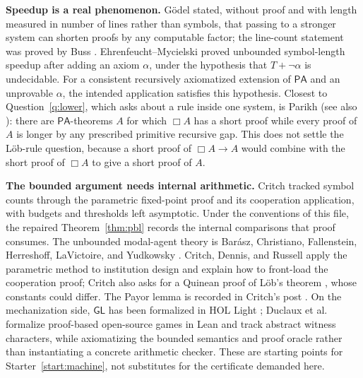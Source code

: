 \documentclass[11pt]{amsart}
\theoremstyle{plain}
\theoremstyle{definition}
\newcommand{\PA}{\mathsf{PA}}
\newcommand{\GL}{\mathsf{GL}}
\begin{document}
\textbf{Speedup is a real phenomenon.} G\"odel \cite{godel1936} stated, without proof and with length measured in number of lines rather than symbols, that passing to a stronger system can shorten proofs by any computable factor; the line-count statement was proved by Buss \cite{buss1994}. Ehrenfeucht--Mycielski \cite{ehrenfeucht1971} proved unbounded symbol-length speedup after adding an axiom $\alpha$, under the hypothesis that $T+\neg\alpha$ is undecidable. For a consistent recursively axiomatized extension of $\PA$ and an unprovable $\alpha$, the intended application satisfies this hypothesis. Closest to Question~\ref{q:lower}, which asks about a rule inside one system, is Parikh \cite{parikh1971} (see also \cite{buss1999}): there are $\PA$-theorems $A$ for which $\Box A$ has a short proof while every proof of $A$ is longer by any prescribed primitive recursive gap. This does not settle the L\"ob-rule question, because a short proof of $\Box A\to A$ would combine with the short proof of $\Box A$ to give a short proof of $A$.

\textbf{The bounded argument needs internal arithmetic.} Critch \cite{critch2016} tracked symbol counts through the parametric fixed-point proof and its cooperation application, with budgets and thresholds left asymptotic. Under the conventions of this file, the repaired Theorem~\ref{thm:pbl} records the internal comparisons that proof consumes. The unbounded modal-agent theory is Bar\'asz, Christiano, Fallenstein, Herreshoff, LaVictoire, and Yudkowsky \cite{barasz2014}. Critch, Dennis, and Russell \cite{cdr2022} apply the parametric method to institution design and explain how to front-load the cooperation proof; Critch also asks for a Quinean proof of L\"ob's theorem \cite{critch2022quine}, whose constants could differ. The Payor lemma is recorded in Critch's post \cite{critchpayor2023}. On the mechanization side, $\GL$ has been formalized in HOL Light \cite{maggesi2023}; Duclaux et al.\ \cite{duclaux2026} formalize proof-based open-source games in Lean and track abstract witness characters, while axiomatizing the bounded semantics and proof oracle rather than instantiating a concrete arithmetic checker. These are starting points for Starter~\ref{start:machine}, not substitutes for the certificate demanded here.
\end{document}

